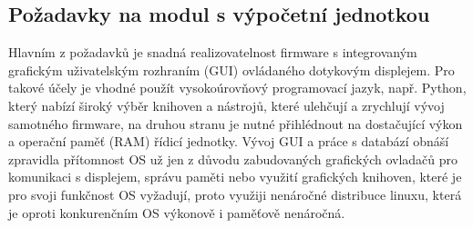 \subsection{Požadavky na modul s výpočetní jednotkou} %

%

Hlavním z požadavků je snadná realizovatelnost firmware s integrovaným grafickým uživatelským rozhraním (GUI) ovládaného dotykovým displejem. Pro takové účely je vhodné použít vysokoúrovňový programovací jazyk, např. Python, který nabízí široký výběr knihoven a nástrojů, které ulehčují a zrychlují vývoj samotného firmware, na druhou stranu je nutné přihlédnout na dostačující výkon a operační paměť (RAM) řídicí jednotky. Vývoj GUI a práce s databází obnáší zpravidla přítomnost OS už jen z důvodu zabudovaných grafických ovladačů pro komunikaci s displejem, správu paměti nebo využití grafických knihoven, které je pro svoji funkčnost OS vyžadují, proto využiji nenáročné distribuce linuxu, která je oproti konkurenčním OS výkonově i paměťově nenáročná.

